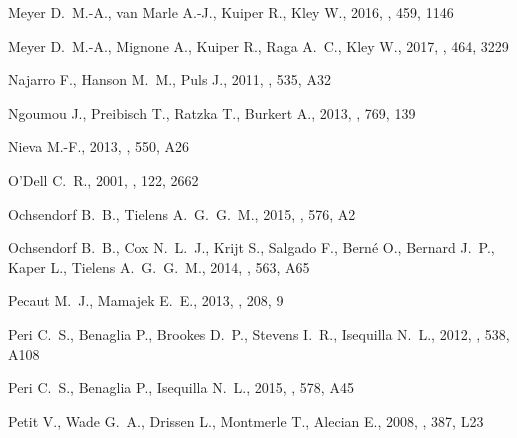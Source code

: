 \documentclass[useAMS, usenatbib, a4paper]{mnras}
\begin{document}
\begin{thebibliography}{}
{Meyer} D.~M.-A.,  {van Marle} A.-J.,  {Kuiper} R.,   {Kley} W.,  2016, \mnras,
  459, 1146

{Meyer} D.~M.-A.,  {Mignone} A.,  {Kuiper} R.,  {Raga} A.~C.,   {Kley} W.,
  2017, \mnras, 464, 3229

{Najarro} F.,  {Hanson} M.~M.,   {Puls} J.,  2011, \aap, 535, A32

{Ngoumou} J.,  {Preibisch} T.,  {Ratzka} T.,   {Burkert} A.,  2013, \apj, 769,
  139

{Nieva} M.-F.,  2013, \aap, 550, A26

{O'Dell} C.~R.,  2001, \aj, 122, 2662

{Ochsendorf} B.~B.,  {Tielens} A.~G.~G.~M.,  2015, \aap, 576, A2

{Ochsendorf} B.~B.,  {Cox} N.~L.~J.,  {Krijt} S.,  {Salgado} F.,  {Bern{\'e}}
  O.,  {Bernard} J.~P.,  {Kaper} L.,   {Tielens} A.~G.~G.~M.,  2014, \aap, 563,
  A65

{Pecaut} M.~J.,  {Mamajek} E.~E.,  2013, \apjs, 208, 9

{Peri} C.~S.,  {Benaglia} P.,  {Brookes} D.~P.,  {Stevens} I.~R.,   {Isequilla}
  N.~L.,  2012, \aap, 538, A108

{Peri} C.~S.,  {Benaglia} P.,   {Isequilla} N.~L.,  2015, \aap, 578, A45

{Petit} V.,  {Wade} G.~A.,  {Drissen} L.,  {Montmerle} T.,   {Alecian} E.,
  2008, \mnras, 387, L23


\end{thebibliography}
\end{document}
